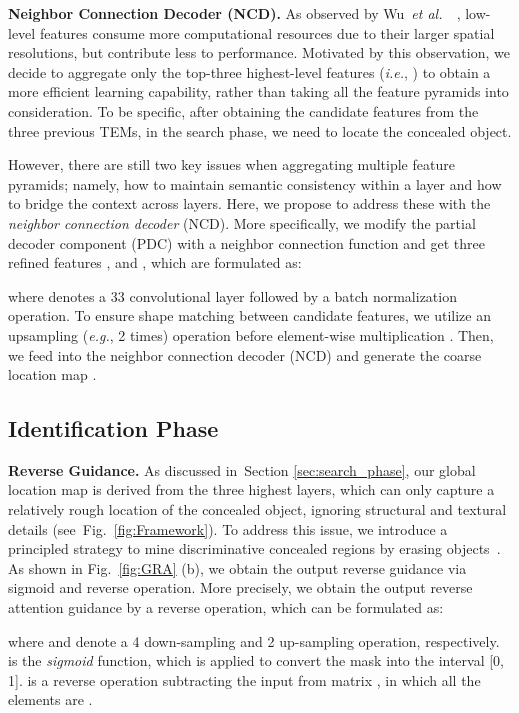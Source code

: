 \documentclass[10pt,journal,compsoc]{IEEEtran}
\def\ie{\emph{i.e.}}
\def\eg{\emph{e.g.}}
\def\etal{{\em et al.~}}
\newcommand{\myPara}[1]{\vspace{6pt}\noindent\textbf{#1}\qquad }
\newcommand{\figref}[1]{Fig.~\ref{#1}}
\newcommand{\secref}[1]{Section \ref{#1}}
\begin{document}
\myPara{Neighbor Connection Decoder (NCD).}
As observed by Wu~\etal~\cite{wu2019cascaded}, 
low-level features consume more computational resources due to 
their larger spatial resolutions, but contribute less to performance.
Motivated by this observation, 
we decide to aggregate only the top-three highest-level features 
(\ie, ) 
to obtain a more efficient learning capability, 
rather than taking all the feature pyramids into consideration.
To be specific, after obtaining the candidate features from the three previous 
TEMs, in the search phase, we need to locate the concealed object.

However, there are still two key issues when aggregating multiple 
feature pyramids; namely, how to maintain semantic consistency within a layer 
and how to bridge the context across layers.
Here, we propose to address these with the \textit{neighbor connection decoder} (NCD).
More specifically, we modify the partial decoder component (PDC)
\cite{wu2019cascaded} with a neighbor connection function and get three refined 
features ,  
and , which are formulated as:

where  denotes a 33 convolutional layer 
followed by a batch normalization operation. 
To ensure shape matching between candidate features, 
we utilize an upsampling (\eg, 2 times) operation 
 before element-wise multiplication .
Then, we feed  into the neighbor connection 
decoder (NCD) and generate the coarse location map . 




\subsection{Identification Phase}\label{sec:identification_phase}

\myPara{Reverse Guidance.}
As discussed in~\secref{sec:search_phase}, 
our global location map  is derived from the three highest layers, 
which can only capture a relatively rough location of the concealed object, 
ignoring structural and textural details (see~\figref{fig:Framework}).
To address this issue, we introduce a principled strategy to mine
discriminative concealed regions 
by erasing objects~\cite{wei2017object,chen2018reverse,fan2020pranet}.
As shown in \figref{fig:GRA} (b), 
we obtain the output reverse guidance  via sigmoid and reverse operation.
More precisely, we obtain the output reverse attention guidance  
by a reverse operation, which can be formulated as:

where  and  denote a 
4 down-sampling and 2 up-sampling operation, respectively. 
 is the \textit{sigmoid} function, 
which is applied to convert the mask into the interval [0, 1].
 is a reverse operation subtracting the input from matrix 
, in which all the elements are .
\end{document}
